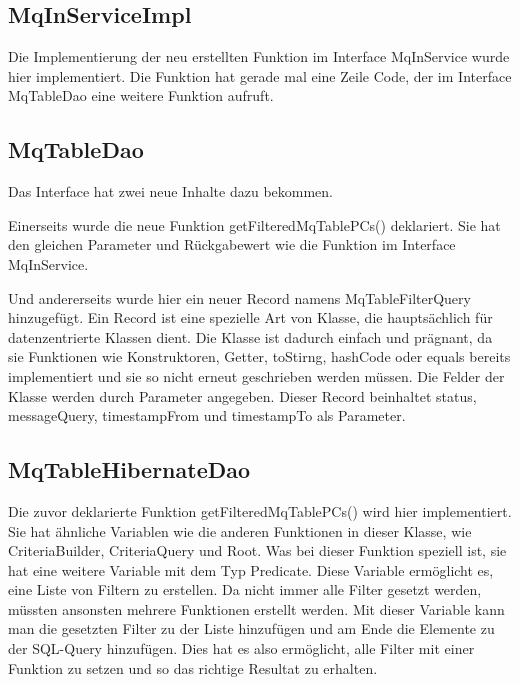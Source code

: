 \subsection{MqInServiceImpl}
Die Implementierung der neu erstellten Funktion im Interface MqInService wurde hier implementiert. Die Funktion hat gerade mal eine Zeile Code, der im Interface MqTableDao eine weitere Funktion aufruft.

\subsection{MqTableDao}
Das Interface hat zwei neue Inhalte dazu bekommen.

Einerseits wurde die neue Funktion getFilteredMqTablePCs() deklariert. Sie hat den gleichen Parameter und Rückgabewert wie die Funktion im Interface MqInService.

Und andererseits wurde hier ein neuer Record namens MqTableFilterQuery hinzugefügt. Ein Record ist eine spezielle Art von Klasse, die hauptsächlich für datenzentrierte Klassen dient. Die Klasse ist dadurch einfach und prägnant, da sie Funktionen wie Konstruktoren, Getter, toStirng, hashCode oder equals bereits implementiert und sie so nicht erneut geschrieben werden müssen. Die Felder der Klasse werden durch Parameter angegeben. Dieser Record beinhaltet status, messageQuery, timestampFrom und timestampTo als Parameter.

\subsection{MqTableHibernateDao}
Die zuvor deklarierte Funktion getFilteredMqTablePCs() wird hier implementiert. Sie hat ähnliche Variablen wie die anderen Funktionen in dieser Klasse, wie CriteriaBuilder, CriteriaQuery und Root. Was bei dieser Funktion speziell ist, sie hat eine weitere Variable mit dem Typ Predicate. Diese Variable ermöglicht es, eine Liste von Filtern zu erstellen. Da nicht immer alle Filter gesetzt werden, müssten ansonsten mehrere Funktionen erstellt werden. Mit dieser Variable kann man die gesetzten Filter zu der Liste hinzufügen und am Ende die Elemente zu der SQL-Query hinzufügen. Dies hat es also ermöglicht, alle Filter mit einer Funktion zu setzen und so das richtige Resultat zu erhalten.

